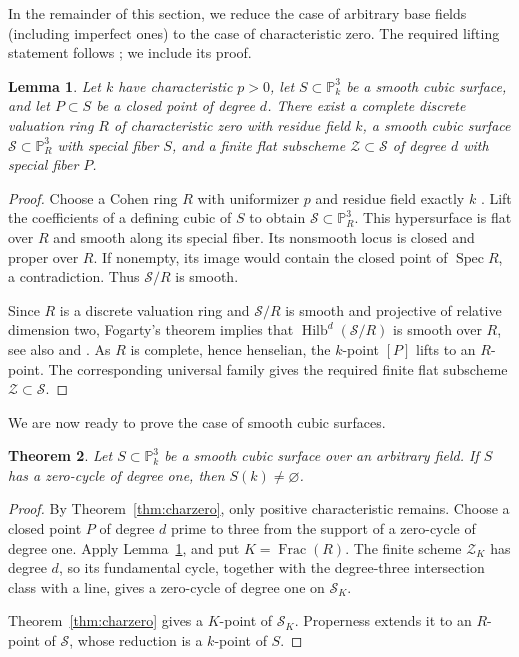\documentclass[a4paper,11pt]{amsart}
\numberwithin{equation}{section}
\newtheorem{theorem}{Theorem}[section]
\newtheorem{lemma}[theorem]{Lemma}
\theoremstyle{definition}
\theoremstyle{remark}
\newcommand{\PP}{\mathbb P}
\newcommand{\Spec}{\operatorname{Spec}}
\newcommand{\Frac}{\operatorname{Frac}}
\begin{document}
In the remainder of this section, we reduce the case 
of arbitrary base fields 
(including imperfect ones) to the case of characteristic zero.
The required lifting statement follows 
\cite[Section~2.2, Lemmas~2.4--2.5]{ma}; we include its proof.

\begin{lemma}\label{lem:lift}
Let $k$ have characteristic $p>0$, let $S\subset\PP^3_k$ be a smooth
cubic surface, and let $P\subset S$ be a closed point of degree $d$.
There exist a complete discrete valuation ring $R$ of characteristic
zero with residue field $k$, a smooth cubic surface
$\mathscr S\subset\PP^3_R$ with special fiber $S$, and a finite flat
subscheme $\mathscr Z\subset\mathscr S$ of degree $d$ with special
fiber $P$.
\end{lemma}
\begin{proof}
Choose a Cohen ring $R$ with uniformizer $p$ and residue field exactly
$k$ \cite[Tag~0328]{Stacks}. Lift the coefficients of a defining cubic
of $S$ to obtain $\mathscr S\subset\PP^3_R$. This hypersurface is
flat over $R$ and smooth along its special fiber. Its nonsmooth locus
is closed and proper over $R$. If nonempty, its image would contain
the closed point of $\Spec R$, a contradiction. Thus
$\mathscr S/R$ is smooth.

Since $R$ is a discrete valuation ring and $\mathcal S/R$ is smooth
and projective of relative dimension two, Fogarty's theorem
\cite[Theorem~2.9]{Fogarty} implies that
$\operatorname{Hilb}^d(\mathcal S/R)$ is smooth over $R$, see also \cite[Tag~06D9]{Stacks} and \cite[Lemma~2.5]{ma}.
As $R$ is complete, hence henselian, the $k$-point $[P]$ lifts
to an $R$-point. The corresponding universal family gives the
required finite flat subscheme $\mathcal Z\subset\mathcal S$. 
\end{proof}


We are now ready to prove the case of smooth cubic surfaces.

\begin{theorem}
\label{thm:smooth}
Let $S\subset\PP^3_k$ be a smooth cubic surface over an arbitrary
field. If $S$ has a zero-cycle of degree one, then
$S(k)\ne\varnothing$.
\end{theorem}
\begin{proof}
By Theorem~\ref{thm:charzero}, only positive characteristic remains.
Choose a closed point $P$ of degree $d$ prime to three from the support
of a zero-cycle of degree one. Apply Lemma~\ref{lem:lift}, and put
$K=\Frac(R)$. The finite scheme $\mathscr Z_K$ has degree $d$,
so its fundamental cycle, together with the degree-three
intersection class with a line, gives a zero-cycle of degree one on $\mathscr S_K$.

Theorem~\ref{thm:charzero} gives a $K$-point of $\mathscr S_K$.
Properness extends it to an $R$-point of $\mathscr S$, whose reduction
is a $k$-point of $S$.
\end{proof}
\end{document}
